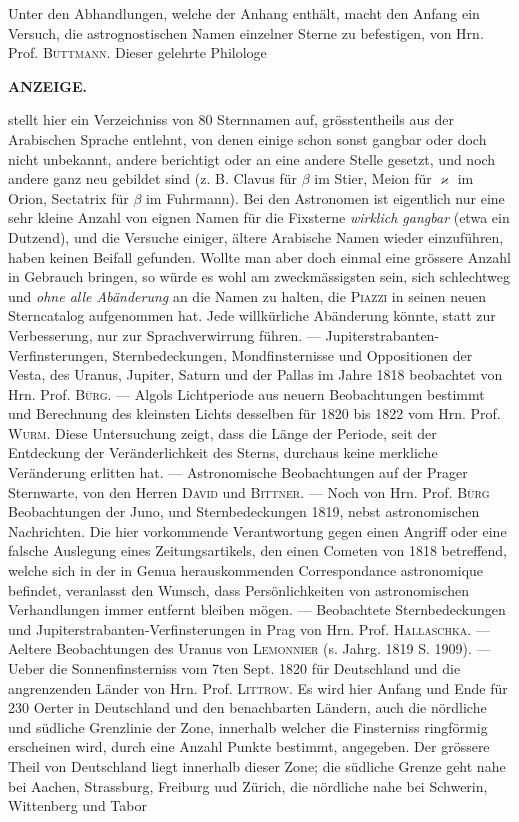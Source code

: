 Unter den Abhandlungen, welche der Anhang enthält, macht den Anfang ein Versuch, die astrognostischen Namen einzelner Sterne zu befestigen, von Hrn. Prof. \textsc{Buttmann}. Dieser gelehrte Philologe\par
\clearpage
{}
\noindent{}%
\parbox[b]{\dimexpr\textwidth-20mm\relax}{\centering\small\textbf{ANZEIGE.}}%
\makebox[10mm][r]{}\par\nobreak\medskip
\noindent stellt hier ein Verzeichniss von 80 Sternnamen auf, grösstentheils aus der Arabischen Sprache entlehnt, von denen einige schon sonst gangbar oder doch nicht unbekannt, andere berichtigt oder an eine andere Stelle gesetzt, und noch andere ganz neu gebildet sind (z. B. Clavus für $\beta$ im Stier, Meion für $\varkappa$ im Orion, 
Sectatrix für $\beta$ im Fuhrmann). Bei den Astronomen ist eigentlich nur eine sehr kleine Anzahl von eignen Namen für die Fixsterne \emph{wirklich gangbar} (etwa ein Dutzend), und die Versuche einiger, ältere Arabische Namen wieder einzuführen, haben keinen Beifall gefunden. Wollte man aber doch einmal eine grössere Anzahl in Gebrauch bringen, so würde es wohl am zweckmässigsten sein, sich schlechtweg und \emph{ohne alle Abänderung} an die Namen zu halten, die \textsc{Piazzi} in seinen neuen Sterncatalog aufgenommen hat. Jede willkürliche Abänderung könnte, statt zur Verbesserung, nur zur Sprachverwirrung führen. --- Jupiterstrabanten-Verfinsterungen, Sternbedeckungen, Mondfinsternisse und Oppositionen der Vesta, des Uranus, Jupiter, Saturn und der Pallas im Jahre 1818 beobachtet von Hrn. Prof. \textsc{Bürg}. --- Algols Lichtperiode aus neuern Beobachtungen bestimmt und Berechnung des kleinsten Lichts desselben für 1820 bis 1822 vom Hrn. Prof. \textsc{Wurm}. Diese Untersuchung zeigt, dass die Länge der Periode, seit der Entdeckung der Veränderlichkeit des Sterns, durchaus keine merkliche Veränderung erlitten hat. --- Astronomische Beobachtungen auf der Prager Sternwarte, von den Herren \textsc{David} und \textsc{Bittner}. --- Noch von Hrn. Prof. \textsc{Bürg} Beobachtungen der Juno, und Sternbedeckungen 1819, nebst astronomischen Nachrichten. Die hier vorkommende Verantwortung gegen einen Angriff oder eine falsche Auslegung eines Zeitungsartikels, den einen Cometen von 1818 betreffend, welche sich in der in Genua herauskommenden Correspondance astronomique befindet, veranlasst den Wunsch, dass Persönlichkeiten von astronomischen Verhandlungen immer entfernt bleiben mögen. --- Beobachtete Sternbedeckungen und Jupiterstrabanten-Verfinsterungen in Prag von Hrn. Prof. \textsc{Hallaschka}. --- Aeltere Beobachtungen des Uranus von \textsc{Lemonnier} (s. Jahrg. 1819 S. 1909). --- Ueber die Sonnenfinsterniss vom 7ten Sept. 1820 für Deutschland und die angrenzenden Länder von Hrn. Prof. \textsc{Littrow}. Es wird hier Anfang und Ende für 230 Oerter in Deutschland und den benachbarten Ländern, auch die nördliche und südliche Grenzlinie der Zone, innerhalb welcher die Finsterniss ringförmig erscheinen wird, durch eine Anzahl Punkte bestimmt, angegeben. Der grössere Theil von Deutschland liegt innerhalb dieser Zone; die südliche Grenze geht nahe bei Aachen, Strassburg, Freiburg uud Zürich, die nördliche nahe bei Schwerin, Wittenberg und Tabor 